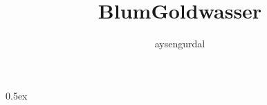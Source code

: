\documentclass[11pt,a4paper]{article}
\begin{document}
\title{BlumGoldwasser}
\author{aysengurdal}
\maketitle

\tableofcontents

\parindent 0pt\parskip 0.5ex



%
%
\end{document}
